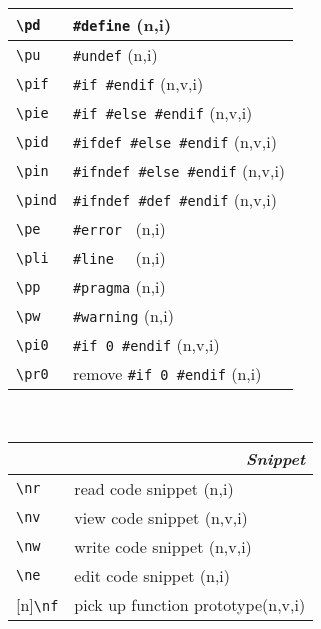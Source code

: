 \documentclass[oneside,11pt,landscape,DIV16]{scrartcl}
\newcommand{\Rep}{{\tiny{[n]}}}
\begin{document}
\begin{multicols}{3}
\begin{center}
\begin{tabular}[]{|p{15mm}|p{55mm}|}
\hline \verb'\pd'   & \verb'#define'               \hfill (n,i)\\
\hline \verb'\pu'   & \verb'#undef'                \hfill (n,i)\\
\hline \verb'\pif'  & \verb'#if #endif'            \hfill (n,v,i)\\
\hline \verb'\pie'  & \verb'#if #else #endif'      \hfill (n,v,i)\\
\hline \verb'\pid'  & \verb'#ifdef #else #endif'   \hfill (n,v,i)\\
\hline \verb'\pin'  & \verb'#ifndef #else #endif'  \hfill (n,v,i)\\
\hline \verb'\pind' & \verb'#ifndef #def #endif'   \hfill (n,v,i)\\
\hline \verb'\pe'   & \verb'#error '               \hfill (n,i)\\
\hline \verb'\pli'  & \verb'#line  '               \hfill (n,i)\\
\hline \verb'\pp'   & \verb'#pragma'               \hfill (n,i)\\
\hline \verb'\pw'   & \verb'#warning'              \hfill (n,i)\\
\hline \verb'\pi0'  & \verb'#if 0 #endif'          \hfill (n,v,i)\\
\hline \verb'\pr0'  & remove \verb'#if 0 #endif'   \hfill (n,i)\\
\hline
\end{tabular} \\
%
%
\begin{tabular}[]{|p{11mm}|p{60mm}|}%
\hline 
\multicolumn{2}{|r|}{\textsl{S\textbf{n}ippet}} \\
\hline     \verb'\nr'  & read code snippet         \hfill (n,i)\\
\hline     \verb'\nv'  & view code snippet         \hfill (n,v,i)\\
\hline     \verb'\nw'  & write code snippet        \hfill (n,v,i)\\
\hline     \verb'\ne'  & edit code snippet         \hfill (n,i)\\
\hline \Rep\verb'\nf'  & pick up function prototype\hfill (n,v,i)\\

\end{tabular}
\end{center}
\end{multicols}
\end{document}
